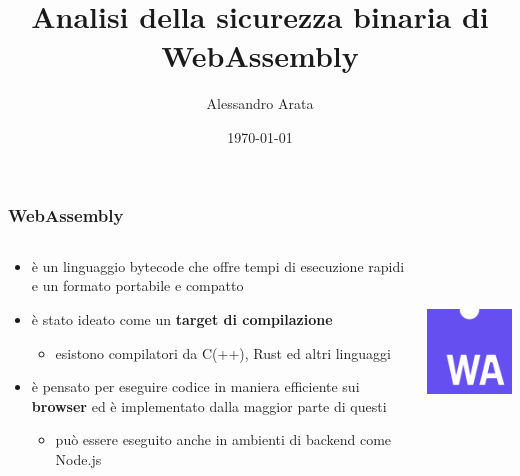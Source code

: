 \documentclass{beamer}
\begin{document}
\title{Analisi della sicurezza binaria di WebAssembly}
\author{Alessandro Arata}
\date{\today}

\begin{frame}
  \titlepage
\end{frame}

\begin{frame}
  \frametitle{WebAssembly}
  \begin{columns}
    \begin{column}{0.6\textwidth}
      \begin{itemize}
        \item è un linguaggio bytecode che offre tempi di esecuzione rapidi e un
        formato portabile e compatto
        \item è stato ideato come un \textbf{target di compilazione}
        \begin{itemize}
          \item esistono compilatori da C(++), Rust ed altri linguaggi
        \end{itemize}
        \item è pensato per eseguire codice in maniera efficiente sui
          \textbf{browser} ed è implementato dalla maggior parte di questi
        \begin{itemize}
          \item può essere eseguito anche in ambienti di backend come Node.js
        \end{itemize}
      \end{itemize}
    \end{column}
    \begin{column}{0.4\textwidth}
      \centerline{\includegraphics[width=4cm,height=5cm,keepaspectratio]{images/logo.png}}
    \end{column}
  \end{columns}
\end{frame}
\end{document}
